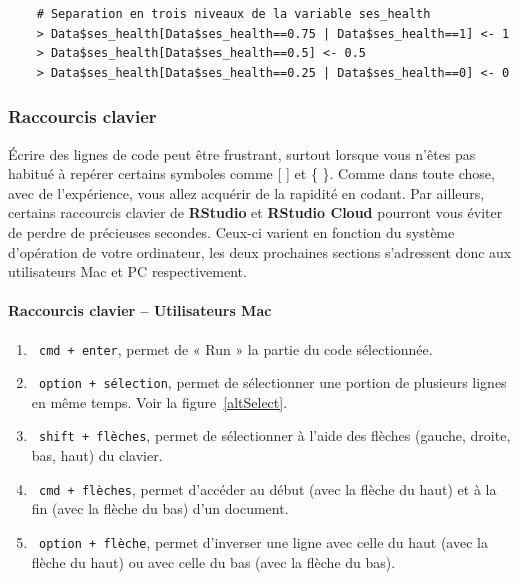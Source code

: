 \documentclass[10.5pt,a4paper]{article}
\newcommand{\rcode}[1]{\texttt{\color{rstudio} #1}}
\begin{document}
    \begin{lstlisting}
    # Separation en trois niveaux de la variable ses_health
    > Data$ses_health[Data$ses_health==0.75 | Data$ses_health==1] <- 1 
    > Data$ses_health[Data$ses_health==0.5] <- 0.5
    > Data$ses_health[Data$ses_health==0.25 | Data$ses_health==0] <- 0
    \end{lstlisting}
    
    \subsubsection{Raccourcis clavier}
    
   Écrire des lignes de code peut être frustrant, surtout lorsque vous n'êtes pas habitué à repérer certains symboles comme [ ] et \{ \}. Comme dans toute chose, avec de l'expérience, vous allez acquérir de la rapidité en codant. Par ailleurs, certains raccourcis clavier de \textbf{RStudio} et \textbf{RStudio Cloud} pourront vous éviter de perdre de précieuses secondes. Ceux-ci varient en fonction du système d'opération de votre ordinateur, les deux prochaines sections s'adressent donc aux utilisateurs Mac et PC respectivement. 
    
      \paragraph{Raccourcis clavier -- Utilisateurs Mac}
      \begin{enumerate}
        \item \rcode{cmd + enter}, permet de « Run » la partie du code sélectionnée.
        \item \rcode{option + sélection}, permet de sélectionner une portion de plusieurs lignes en même temps. Voir la figure~\ref{altSelect}.
        \item \rcode{shift + flèches}, permet de sélectionner à l'aide des flèches (gauche, droite, bas, haut) du clavier.
        \item \rcode{cmd + flèches}, permet d'accéder au début (avec la flèche du haut) et à la fin (avec la flèche du bas) d'un document.
        \item \rcode{option + flèche}, permet d'inverser une ligne avec celle du haut (avec la flèche du haut) ou avec celle du bas (avec la flèche du bas).
      \end{enumerate}
      
\end{document}
